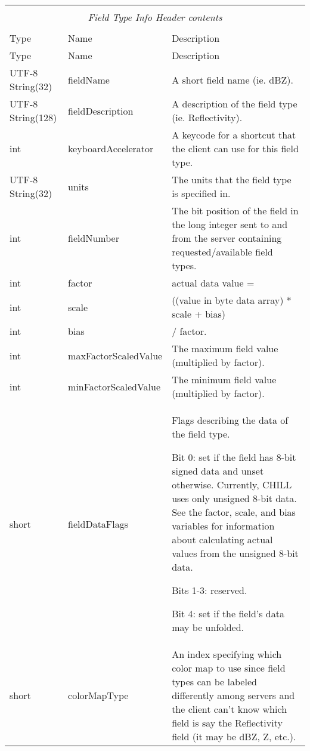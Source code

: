 \documentclass[10pt]{article}
\newcommand{\tblspc}{\rule{0pt}{3ex}}
\begin{document}
\begin{longtable}{|p{}|l|p{}|}
\hline
\multicolumn{3}{|c|}{} \\
\multicolumn{3}{|c|}{\emph{Field Type Info Header contents}} \\
\multicolumn{3}{|c|}{} \\
\hline Type & Name & Description \\ \hline \endfirsthead
\hline Type & Name & Description \\ \hline \endhead
\hline \endfoot
\tblspc UTF-8 String(32) & fieldName & A short field name (ie. dBZ). \\
\hline
\tblspc UTF-8 String(128) & fieldDescription & A description of the field type (ie. Reflectivity). \\
\hline
\tblspc int & keyboardAccelerator & A keycode for a shortcut that the client can use for this field type. \\
\hline
\tblspc UTF-8 String(32) & units & The units that the field type is specified in. \\
\hline
\tblspc int & fieldNumber & The bit position of the field in the long integer sent to and from the server containing requested/available field types. \\
\hline
\tblspc int & factor & actual data value = \\
\tblspc int & scale & ((value in byte data array) * scale + bias) \\
\tblspc int & bias & / factor. \\
\hline
\tblspc int & maxFactorScaledValue & The maximum field value (multiplied by factor). \\
\hline
\tblspc int & minFactorScaledValue & The minimum field value (multiplied by factor). \\
\hline
\tblspc short & fieldDataFlags & Flags describing the data of the field type.
	\par Bit 0: set if the field has 8-bit signed data and unset otherwise. Currently, CHILL uses only unsigned 8-bit data. See the factor, scale, and bias variables for information about calculating actual values from the unsigned 8-bit data.
	\par Bits 1-3: reserved.
	\par Bit 4: set if the field's data may be unfolded. \\
\hline
\tblspc short & colorMapType & An index specifying which color map to use since field types can be labeled differently among servers and the client can't know which field is say the Reflectivity field (it may be dBZ, Z, etc.). \\
\hline
\end{longtable}
\end{document}
